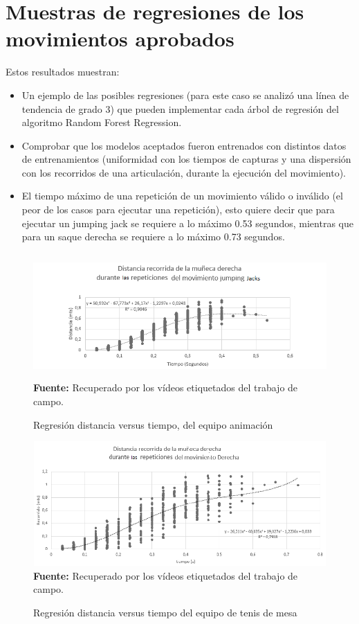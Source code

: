 \section{Muestras de regresiones de los movimientos aprobados} \label{res:regretions}
Estos resultados muestran:
\begin{itemize}
\item  Un ejemplo de las posibles regresiones (para este caso se analiz\'o una l\'inea de tendencia de grado 3) que pueden implementar cada \'arbol de regresi\'on del algoritmo Random Forest Regression.
\item  Comprobar que los modelos aceptados fueron entrenados con distintos datos de entrenamientos (uniformidad con los tiempos de capturas y una dispersi\'on con los recorridos de una articulaci\'on, durante la ejecuci\'on del  movimiento).
\item  El tiempo m\'aximo de una repetici\'on de un movimiento v\'alido o inv\'alido (el peor de los casos para ejecutar una repetici\'on), esto quiere  decir que para ejecutar un jumping jack se requiere a lo m\'aximo 0.53 segundos, mientras que para un saque derecha se requiere a lo m\'aximo 0.73 segundos.
\end{itemize}

\begin{figure}[H]
	\caption{Regresi\'on distancia versus tiempo, del equipo animaci\'on}
	\label{fig:regrCheerleader}
	\centering
	\includegraphics[width=445px,height=180px]{graphics/resultados/cluster-cheerleaders.PNG} \\
	\textbf{Fuente:} Recuperado por los v\'ideos etiquetados del trabajo de campo.
\end{figure}
\begin{figure}[H]
	\caption{Regresi\'on distancia versus tiempo  del equipo de tenis de mesa}
	\label{fig:regrTennisDeMesa}
	\centering
	\includegraphics[width=445px,height=180px]{graphics/resultados/cluster-tennis.PNG} \\
	\textbf{Fuente:} Recuperado por los v\'ideos etiquetados del trabajo de campo.
\end{figure}
